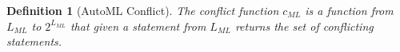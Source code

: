 \documentclass[5p,times]{elsarticle}
\newtheorem{definition}{Definition}
\newcommand{\gp}[1]{{\color{red}{\textbf{#1}}}}
\begin{document}
\begin{definition}[AutoML Conflict]\label{conflictauto}
The conflict function $c_{ML}$ is a function from $L_{ML}$ to $2^{L_{ML}}$ that given a statement from $L_{ML}$ returns the set of conflicting statements.
\end{definition}
\end{document}
